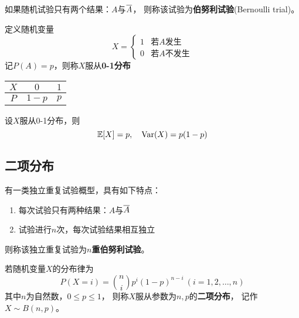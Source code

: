 \begin{definition}[伯努利试验]
  如果随机试验只有两个结果：$A$与$\overline{A}$，
  则称该试验为\textbf{伯努利试验}(Bernoulli trial)。
\end{definition}

\begin{definition}[0-1分布]
  定义随机变量
  \begin{displaymath}
    X = \begin{cases}
      1 & \text{若$A$发生} \\
      0 & \text{若$A$不发生}
    \end{cases}
  \end{displaymath}
  记$P(A)=p$，则称$X$服从\textbf{0-1分布}
  \begin{center}
    \begin{tabular}{c|cc}
      $X$ & $0$ & $1$ \\ 
      \hline 
      $P$ & $1-p$ & $p$ \\ 
      \end{tabular} 
  \end{center}
\end{definition}

\begin{theorem}[0-1分布的数字特征]
  设$X$服从0-1分布，则
  \begin{displaymath}
    \mathbb{E}[X]=p,\quad \textrm{Var}(X) = p(1-p)
  \end{displaymath}
\end{theorem}

\subsection{二项分布}
\begin{definition}[$n$重伯努利试验]
  有一类独立重复试验概型，具有如下特点：
  \begin{enumerate}
    \item 每次试验只有两种结果：$A$与$\overline{A}$
    \item 试验进行$n$次，每次试验结果相互独立
  \end{enumerate}
  则称该独立重复试验为\textbf{$n$重伯努利试验}。
\end{definition}

\begin{definition}[二项分布]
  若随机变量$X$的分布律为
  \begin{displaymath}
    P(X=i) = \binom{n}{i}p^i(1-p)^{n-i}\ (i=1,2,\dots,n)
  \end{displaymath}
  其中$n$为自然数，$0\le p \le 1$，
  则称$X$服从参数为$n,p$的\textbf{二项分布}，
  记作$X\sim B(n,p)$。
\end{definition}

